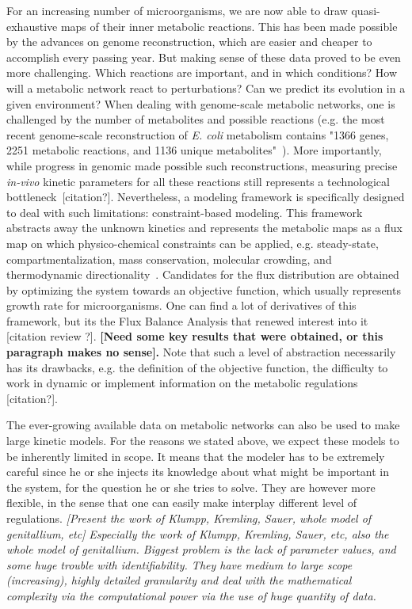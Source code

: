 For an increasing number of microorganisms, we are now able to draw quasi-exhaustive maps of their inner metabolic reactions.
This has been made possible by the advances on genome reconstruction, which are easier and cheaper to accomplish every passing year.
But making sense of these data proved to be even more challenging.
Which reactions are important, and in which conditions?
How will a metabolic network react to perturbations?
Can we predict its evolution in a given environment?
When dealing with genome-scale metabolic networks, one is challenged by the number of metabolites and possible reactions (e.g. the most recent genome-scale reconstruction of \textit{E. coli} metabolism contains "1366 genes, 2251 metabolic reactions, and 1136 unique metabolites"~\cite{orth_comprehensive_2011}).
More importantly, while progress in genomic made possible such reconstructions, measuring precise \textit{in-vivo} kinetic parameters for all these reactions still represents a technological bottleneck~[citation?].
Nevertheless, a modeling framework is specifically designed to deal with such limitations: constraint-based modeling.
This framework abstracts away the unknown kinetics and represents the metabolic maps as a flux map on which physico-chemical constraints can be applied, e.g. steady-state, compartmentalization, mass conservation, molecular crowding, and thermodynamic directionality~\cite{ebrahim_cobrapy_2013}.
Candidates for the flux distribution are obtained by optimizing the system towards an objective function, which usually represents growth rate for microorganisms.
One can find a lot of derivatives of this framework, but its the Flux Balance Analysis that renewed interest into it [citation review ?].
\textbf{[Need some key results that were obtained, or this paragraph makes no sense].}
Note that such a level of abstraction necessarily has its drawbacks, e.g. the definition of the objective function, the difficulty to work in dynamic or implement information on the metabolic regulations [citation?].

The ever-growing available data on metabolic networks can also be used to make large kinetic models.
For the reasons we stated above, we expect these models to be inherently limited in scope.
It means that the modeler has to be extremely careful since he or she injects its knowledge about what might be important in the system, for the question he or she tries to solve.
They are however more flexible, in the sense that one can easily make interplay different level of regulations.
\textit{[Present the work of Klumpp, Kremling, Sauer, whole model of genitallium, etc]
}\textit{Especially the work of Klumpp, Kremling, Sauer, etc, also the whole model of genitallium.
Biggest problem is the lack of parameter values, and some huge trouble with identifiability.
They have medium to large scope (increasing), highly detailed granularity and deal with the mathematical complexity via the computational power via the use of huge quantity of data.}

